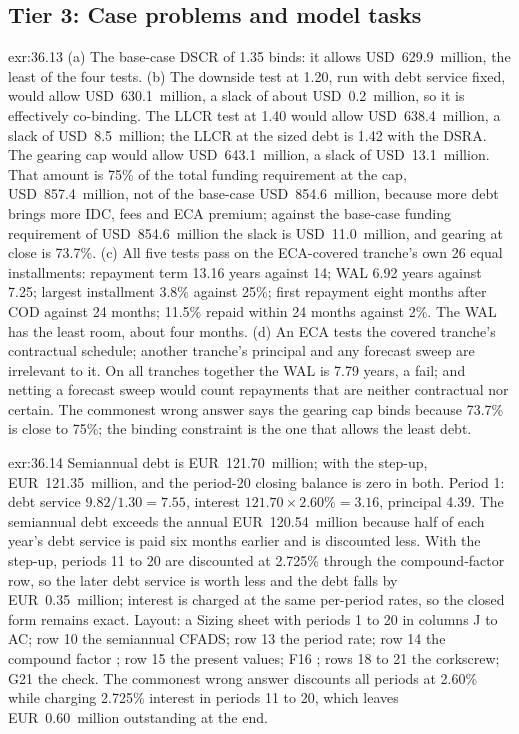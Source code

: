 \subsection*{Tier 3: Case problems and model tasks}

\begin{solution}{exr:36.13}
(a) The base-case DSCR of 1.35\x{} binds: it allows USD~629.9~million, the least of the four tests. (b) The downside test at 1.20\x, run with debt service fixed, would allow USD~630.1~million, a slack of about USD~0.2~million, so it is effectively co-binding. The LLCR test at 1.40\x{} would allow USD~638.4~million, a slack of USD~8.5~million; the LLCR at the sized debt is 1.42\x{} with the DSRA. The gearing cap would allow USD~643.1~million, a slack of USD~13.1~million. That amount is 75\% of the total funding requirement at the cap, USD~857.4~million, not of the base-case USD~854.6~million, because more debt brings more IDC, fees and ECA premium; against the base-case funding requirement of USD~854.6~million the slack is USD~11.0~million, and gearing at close is 73.7\%. (c) All five tests pass on the ECA-covered tranche's own 26 equal installments: repayment term 13.16 years against 14; WAL 6.92 years against 7.25; largest installment 3.8\% against 25\%; first repayment eight months after COD against 24 months; 11.5\% repaid within 24 months against 2\%. The WAL has the least room, about four months. (d) An ECA tests the covered tranche's contractual schedule; another tranche's principal and any forecast sweep are irrelevant to it. On all tranches together the WAL is 7.79 years, a fail; and netting a forecast sweep would count repayments that are neither contractual nor certain. The commonest wrong answer says the gearing cap binds because 73.7\% is close to 75\%; the binding constraint is the one that allows the least debt.
\end{solution}

\begin{solution}{exr:36.14}
Semiannual debt is EUR~121.70~million; with the step-up, EUR~121.35~million, and the period-20 closing balance is zero in both. Period 1: debt service $9.82/1.30 = 7.55$, interest $121.70 \times 2.60\% = 3.16$, principal 4.39. The semiannual debt exceeds the annual EUR~120.54~million because half of each year's debt service is paid six months earlier and is discounted less. With the step-up, periods 11 to 20 are discounted at 2.725\% through the compound-factor row, so the later debt service is worth less and the debt falls by EUR~0.35~million; interest is charged at the same per-period rates, so the closed form remains exact. Layout: a Sizing sheet with periods 1 to 20 in columns J to AC; row 10 the semiannual CFADS; row 13 the period rate; row 14 the compound factor ; row 15 the present values; F16 ; rows 18 to 21 the corkscrew; G21 the check. The commonest wrong answer discounts all periods at 2.60\% while charging 2.725\% interest in periods 11 to 20, which leaves EUR~0.60~million outstanding at the end.
\end{solution}

